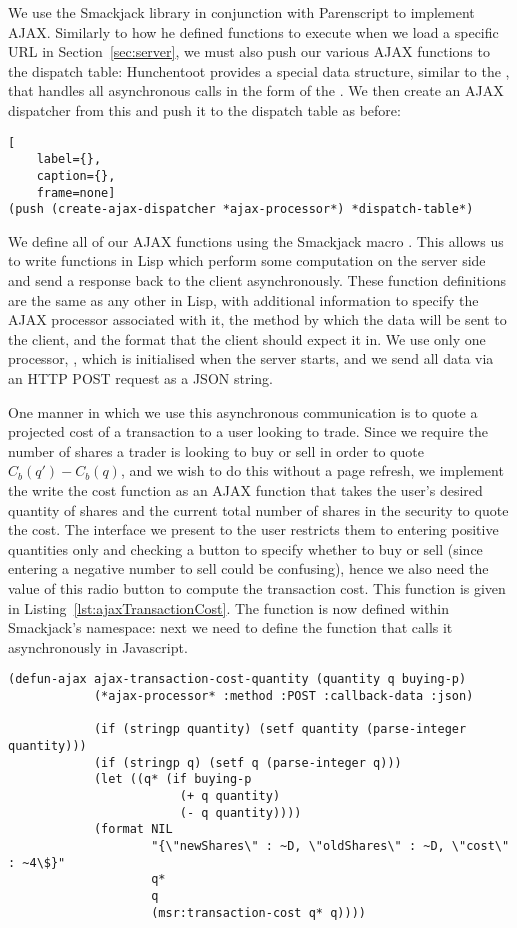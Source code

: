 We use the Smackjack library in conjunction with Parenscript to implement AJAX.
Similarly to how he defined functions to execute when we load a specific URL in
Section~\ref{sec:server}, we must also push our various AJAX functions to the
dispatch table: Hunchentoot provides a special data structure, similar to the
, that handles all asynchronous calls in the form of the
. We then create an AJAX dispatcher from this and push it
to the dispatch table as before: 

\begin{lstlisting}[
	label={},
	caption={},
	frame=none]
(push (create-ajax-dispatcher *ajax-processor*) *dispatch-table*)
\end{lstlisting}

We define all of our AJAX functions using the Smackjack macro
. This allows us to write functions in Lisp which perform some
computation on the server side and send a response back to the client
asynchronously. These function definitions are the same as any other in Lisp,
with additional information to specify the AJAX processor associated with it,
the method by which the data will be sent to the client, and the format that
the client should expect it in. We use only one processor,
, which is initialised when the server starts, and we
send all data via an HTTP POST request as a JSON string.

One manner in which we use this asynchronous communication is to quote a
projected cost of a transaction to a user looking to trade. Since we require
the number of shares a trader is looking to buy or sell in order to quote
$C_b(q')-C_b(q)$, and we wish to do this without a page refresh, we implement
the write the cost function as an AJAX function that takes the user's desired
quantity of shares and the current total number of shares in the security to
quote the cost. The interface we present to the user restricts them to entering
positive quantities only and checking a button to specify whether to buy or
sell (since entering a negative number to sell could be confusing), hence we
also need the value of this radio button to compute the transaction cost. This
function is given in Listing~\ref{lst:ajaxTransactionCost}. The function is now
defined within Smackjack's namespace: next we need to define the function that
calls it asynchronously in Javascript.

\begin{lstlisting}[float,
	label={lst:ajaxTransactionCost},
	caption={Defining an AJAX function for computing transaction cost using
	Smackjack}]
(defun-ajax ajax-transaction-cost-quantity (quantity q buying-p)
			(*ajax-processor* :method :POST :callback-data :json)

			(if (stringp quantity) (setf quantity (parse-integer quantity)))
			(if (stringp q) (setf q (parse-integer q)))
			(let ((q* (if buying-p
						(+ q quantity)
						(- q quantity))))
			(format NIL 
					"{\"newShares\" : ~D, \"oldShares\" : ~D, \"cost\" : ~4\$}"
					q*
					q
					(msr:transaction-cost q* q))))
\end{lstlisting}

